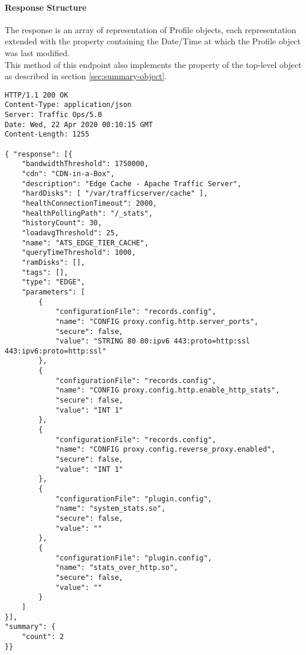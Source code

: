 \paragraph{Response Structure}
The response is an array of representation of Profile objects, each
representation extended with the  property containing the
Date/Time at which the Profile object was last modified.\\
This method of this endpoint also implements the  property of the
top-level  object as described in section
\ref{sec:summary-object}.

\begin{codelisting}
\begin{verbatim}
HTTP/1.1 200 OK
Content-Type: application/json
Server: Traffic Ops/5.0
Date: Wed, 22 Apr 2020 00:10:15 GMT
Content-Length: 1255

{ "response": [{
	"bandwidthThreshold": 1750000,
	"cdn": "CDN-in-a-Box",
	"description": "Edge Cache - Apache Traffic Server",
	"hardDisks": [ "/var/trafficserver/cache" ],
	"healthConnectionTimeout": 2000,
	"healthPollingPath": "/_stats",
	"historyCount": 30,
	"loadavgThreshold": 25,
	"name": "ATS_EDGE_TIER_CACHE",
	"queryTimeThreshold": 1000,
	"ramDisks": [],
	"tags": [],
	"type": "EDGE",
	"parameters": [
		{
			"configurationFile": "records.config",
			"name": "CONFIG proxy.config.http.server_ports",
			"secure": false,
			"value": "STRING 80 80:ipv6 443:proto=http:ssl 443:ipv6:proto=http:ssl"
		},
		{
			"configurationFile": "records.config",
			"name": "CONFIG proxy.config.http.enable_http_stats",
			"secure": false,
			"value": "INT 1"
		},
		{
			"configurationFile": "records.config",
			"name": "CONFIG proxy.config.reverse_proxy.enabled",
			"secure": false,
			"value": "INT 1"
		},
		{
			"configurationFile": "plugin.config",
			"name": "system_stats.so",
			"secure": false,
			"value": ""
		},
		{
			"configurationFile": "plugin.config",
			"name": "stats_over_http.so",
			"secure": false,
			"value": ""
		}
	]
}],
"summary": {
	"count": 2
}}
\end{verbatim}
\end{codelisting}

\subsection{}
